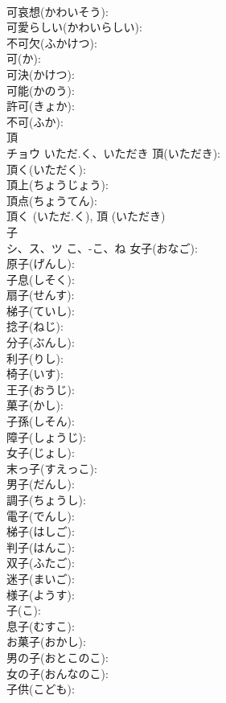 \documentclass[8pt]{extreport}
\begin{document}
\begin{CJK}{UTF8}{min}
\\	可哀想(かわいそう): 
\\	可愛らしい(かわいらしい): 
\\	不可欠(ふかけつ): 
\\	可(か): 
\\	可決(かけつ): 
\\	可能(かのう): 
\\	許可(きょか): 
\\	不可(ふか): 
\\	頂			
\\	チョウ	いただ.く、いただき	頂(いただき): 
\\	頂く(いただく): 
\\	頂上(ちょうじょう): 
\\	頂点(ちょうてん): 
\\	頂く (いただ.く), 頂 (いただき)
\\	子			
\\	シ、ス、ツ	こ、-こ、ね	女子(おなご): 
\\	原子(げんし): 
\\	子息(しそく): 
\\	扇子(せんす): 
\\	梯子(ていし): 
\\	捻子(ねじ): 
\\	分子(ぶんし): 
\\	利子(りし): 
\\	椅子(いす): 
\\	王子(おうじ): 
\\	菓子(かし): 
\\	子孫(しそん): 
\\	障子(しょうじ): 
\\	女子(じょし): 
\\	末っ子(すえっこ): 
\\	男子(だんし): 
\\	調子(ちょうし): 
\\	電子(でんし): 
\\	梯子(はしご): 
\\	判子(はんこ): 
\\	双子(ふたご): 
\\	迷子(まいご): 
\\	様子(ようす): 
\\	子(こ): 
\\	息子(むすこ): 
\\	お菓子(おかし): 
\\	男の子(おとこのこ): 
\\	女の子(おんなのこ): 
\\	子供(こども): 

\end{CJK}
\end{document}
